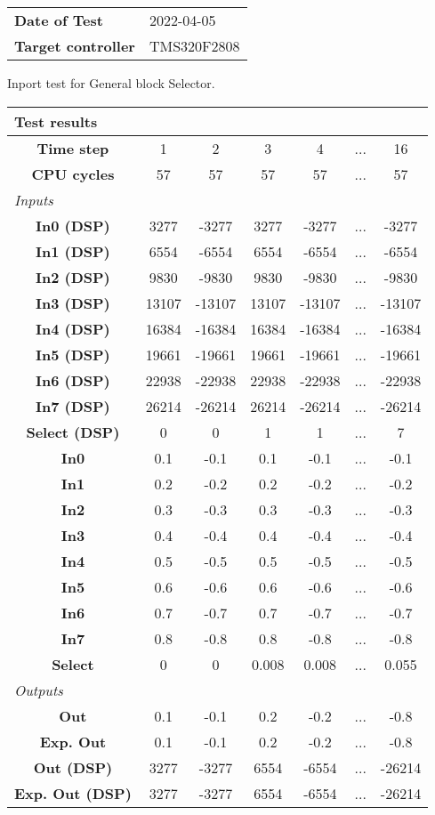 \begin{tabular}{l l}
\textbf{Date of Test} & 2022-04-05 \tabularnewline
\textbf{Target controller} & TMS320F2808 \tabularnewline
\end{tabular}
\vspace{1ex}
Inport test for General block Selector.

\vspace{1em}
\begin{tabularx}{\textwidth}{|c|c|c|c|c|>{\centering\arraybackslash}X|c|}
\hline
\multicolumn{7}{|l|}{\cellcolor[gray]{0.8}\textbf{Test results}} \tabularnewline \hline
\textbf{Time step} & 1 & 2 & 3 & 4 & ... & 16 \tabularnewline \hline
\textbf{CPU cycles} & 57 & 57 & 57 & 57 & ... & 57 \tabularnewline \hline
\multicolumn{7}{|l|}{\cellcolor[gray]{0.9}\textit{Inputs}} \tabularnewline \hline
\textbf{In0 (DSP)} & 3277 & -3277 & 3277 & -3277 & ... & -3277 \tabularnewline \hline
\textbf{In1 (DSP)} & 6554 & -6554 & 6554 & -6554 & ... & -6554 \tabularnewline \hline
\textbf{In2 (DSP)} & 9830 & -9830 & 9830 & -9830 & ... & -9830 \tabularnewline \hline
\textbf{In3 (DSP)} & 13107 & -13107 & 13107 & -13107 & ... & -13107 \tabularnewline \hline
\textbf{In4 (DSP)} & 16384 & -16384 & 16384 & -16384 & ... & -16384 \tabularnewline \hline
\textbf{In5 (DSP)} & 19661 & -19661 & 19661 & -19661 & ... & -19661 \tabularnewline \hline
\textbf{In6 (DSP)} & 22938 & -22938 & 22938 & -22938 & ... & -22938 \tabularnewline \hline
\textbf{In7 (DSP)} & 26214 & -26214 & 26214 & -26214 & ... & -26214 \tabularnewline \hline
\textbf{Select (DSP)} & 0 & 0 & 1 & 1 & ... & 7 \tabularnewline \hline
\textbf{In0} & 0.1 & -0.1 & 0.1 & -0.1 & ... & -0.1 \tabularnewline \hline
\textbf{In1} & 0.2 & -0.2 & 0.2 & -0.2 & ... & -0.2 \tabularnewline \hline
\textbf{In2} & 0.3 & -0.3 & 0.3 & -0.3 & ... & -0.3 \tabularnewline \hline
\textbf{In3} & 0.4 & -0.4 & 0.4 & -0.4 & ... & -0.4 \tabularnewline \hline
\textbf{In4} & 0.5 & -0.5 & 0.5 & -0.5 & ... & -0.5 \tabularnewline \hline
\textbf{In5} & 0.6 & -0.6 & 0.6 & -0.6 & ... & -0.6 \tabularnewline \hline
\textbf{In6} & 0.7 & -0.7 & 0.7 & -0.7 & ... & -0.7 \tabularnewline \hline
\textbf{In7} & 0.8 & -0.8 & 0.8 & -0.8 & ... & -0.8 \tabularnewline \hline
\textbf{Select} & 0 & 0 & 0.008 & 0.008 & ... & 0.055 \tabularnewline \hline
\multicolumn{7}{|l|}{\cellcolor[gray]{0.9}\textit{Outputs}} \tabularnewline \hline
\textbf{Out} & 0.1 & -0.1 & 0.2 & -0.2 & ... & -0.8 \tabularnewline \hline
\textbf{Exp. Out} & 0.1 & -0.1 & 0.2 & -0.2 & ... & -0.8 \tabularnewline \hline
\textbf{Out (DSP)} & 3277 & -3277 & 6554 & -6554 & ... & -26214 \tabularnewline \hline
\textbf{Exp. Out (DSP)} & 3277 & -3277 & 6554 & -6554 & ... & -26214 \tabularnewline \hline
\end{tabularx}
\vspace{1ex}

